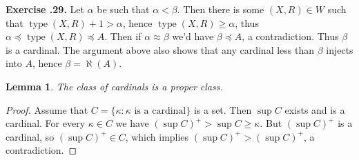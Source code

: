 \documentclass{report}
\newtheorem{lemma}{Lemma}[section]
\theoremstyle{definition}
\theoremstyle{remark}
\newenvironment{exc}[1]{\noindent\textbf{Exercise \thesection.#1.}}{\medskip}
\newcommand{\set}[1]{\{#1\}}
\DeclareMathOperator{\type}{type}
\begin{document}
\begin{exc}{29}
    Let $\alpha$ be such that $\alpha < \beta$. Then there is some $(X, R) \in W$ such that $\type(X, R) + 1 > \alpha$, hence $\type(X, R) \geq \alpha$, thus $\alpha \preceq \type(X, R) \preceq A$. Then if $\alpha \approx \beta$ we'd have $\beta \preceq A$, a contradiction. Thus $\beta$ is a cardinal. The argument above also shows that any cardinal less than $\beta$ injects into $A$, hence $\beta = \aleph(A)$.
\end{exc}

\begin{lemma}
    The class of cardinals is a proper class.
\end{lemma}

\begin{proof}
    Assume that $C = \set{\kappa : \text{$\kappa$ is a cardinal}}$ is a set. Then $\sup C$ exists and is a cardinal. For every $\kappa \in C$ we have $(\sup C)^+ > \sup C \geq \kappa$. But $(\sup C)^+$ is a cardinal, so $(\sup C)^+ \in C$, which implies $(\sup C)^+ > (\sup C)^+$, a contradiction.
\end{proof}
\end{document}
